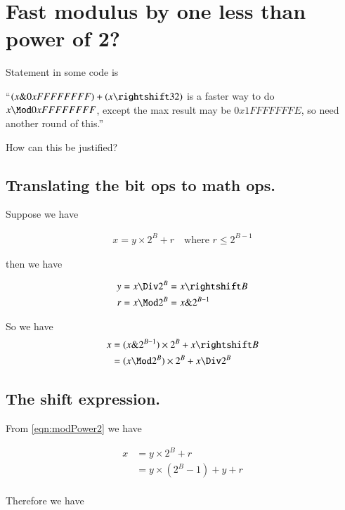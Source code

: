 \documentclass{article}
\begin{document}
\section{Fast modulus by one less than power of 2? }

Statement in some code is

``$(x \& 0xFFFFFFFF) + (x \rightshift 32)$ is a faster way to do $x \Mod 0xFFFFFFFF$, except the max result may be
$0x1FFFFFFFE$, so need another round of this.''

How can this be justified?

\subsection{Translating the bit ops to math ops. }

Suppose we have 

\begin{align}\label{eqn:modPower2}
x = y \times 2^B + r \quad \mbox{where $r \le 2^{B-1}$}
\end{align}

then we have

\begin{align*}
y &= x \Div 2^{B} = x \rightshift B \\
r &= x \Mod 2^B = x \& 2^{B-1}
\end{align*}

So we have
\begin{align*}
x 
&= (x \& 2^{B-1}) \times 2^B + x \rightshift B \\
&= (x \Mod 2^B) \times 2^B + x \Div 2^B \\
\end{align*}

\subsection{The shift expression. }

From \ref{eqn:modPower2} we have

\begin{align*}
x 
&= y \times 2^B + r \\
&= y \times (2^B -1) + y + r \\
\end{align*}

Therefore we have
\end{document}
